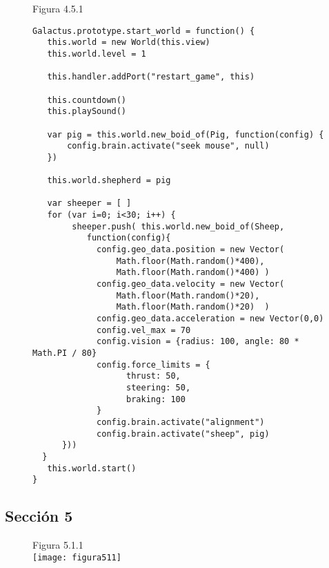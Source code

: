 \begin{figure}
Figura 4.5.1
\begin{verbatim}
Galactus.prototype.start_world = function() {
   this.world = new World(this.view)
   this.world.level = 1

   this.handler.addPort("restart_game", this)
   
   this.countdown()
   this.playSound()

   var pig = this.world.new_boid_of(Pig, function(config) {
       config.brain.activate("seek mouse", null)
   })

   this.world.shepherd = pig

   var sheeper = [ ]
   for (var i=0; i<30; i++) {
        sheeper.push( this.world.new_boid_of(Sheep, 
           function(config){
             config.geo_data.position = new Vector(
                 Math.floor(Math.random()*400), 
                 Math.floor(Math.random()*400) )
             config.geo_data.velocity = new Vector(
                 Math.floor(Math.random()*20), 
                 Math.floor(Math.random()*20)  )
             config.geo_data.acceleration = new Vector(0,0)
             config.vel_max = 70
             config.vision = {radius: 100, angle: 80 * Math.PI / 80}           
             config.force_limits = {
                   thrust: 50,
                   steering: 50,
                   braking: 100
             }
             config.brain.activate("alignment")
             config.brain.activate("sheep", pig)
      }))
  }
   this.world.start()
}
\end{verbatim}
\end{figure}



\subsection{Sección 5}
\label{subsubsection:seccion5}

\begin{figure}
Figura 5.1.1\\
\texttt{[image: figura511]}\\
\end{figure}


